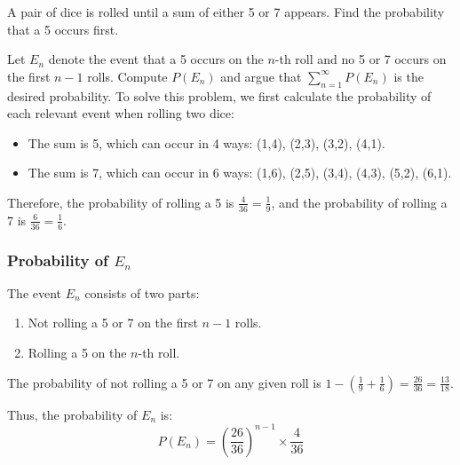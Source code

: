         \begin{exercise}
            A pair of dice is rolled until a sum of either 5 or 7 appears. Find the probability that a 5 occurs first.
        \end{exercise}
        \begin{solution}
            Let \( E_n \) denote the event that a 5 occurs on the \( n \)-th roll and no 5 or 7 occurs on the first \( n-1 \) rolls. Compute \( P(E_n) \) and argue that \( \sum_{n=1}^{\infty} P(E_n) \) is the desired probability.
            To solve this problem, we first calculate the probability of each relevant event when rolling two dice:

            \begin{itemize}
                \item The sum is 5, which can occur in 4 ways: (1,4), (2,3), (3,2), (4,1).
                \item The sum is 7, which can occur in 6 ways: (1,6), (2,5), (3,4), (4,3), (5,2), (6,1).
            \end{itemize}

            Therefore, the probability of rolling a 5 is \( \frac{4}{36} = \frac{1}{9} \), and the probability of rolling a 7 is \( \frac{6}{36} = \frac{1}{6} \).

            \subsubsection*{Probability of \( E_n \)}
            The event \( E_n \) consists of two parts:
            \begin{enumerate}
                \item Not rolling a 5 or 7 on the first \( n-1 \) rolls.
                \item Rolling a 5 on the \( n \)-th roll.
            \end{enumerate}

            The probability of not rolling a 5 or 7 on any given roll is \( 1 - \left(\frac{1}{9} + \frac{1}{6}\right) = \frac{26}{36} = \frac{13}{18} \).

            Thus, the probability of \( E_n \) is:
            \[
            P(E_n) = \left(\frac{26}{36}\right)^{n-1} \times \frac{4}{36}
            \]

\end{solution}
